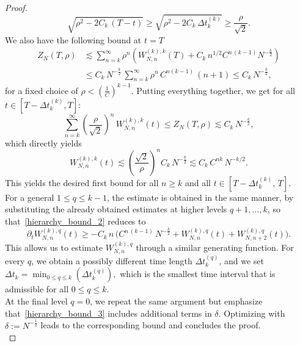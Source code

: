 \documentclass[pdflatex,sn-mathphys-num]{sn-jnl}
\theoremstyle{thmstyleone}%
\theoremstyle{thmstyletwo}%
\theoremstyle{thmstylethree}%
\begin{document}
\begin{proof}
\[
 \sqrt{\rho^2 - 2C_k\,(T-t)} \geq \sqrt{\rho^{2} - 2C_k\, \Delta t_k^{(k)} }\geq \frac{\rho}{\sqrt{2}} .
 \]
We also have the following bound at $t=T$
\begin{align*}
Z_{N}(T, \rho) 
&\lesssim \sum_{n=k}^\infty \rho^n \left(  W^{(k),k}_{N,n} (T) 
+ C_k\,n^{1/2} C^{n\,(k-1)} N^{-\frac{k}{2}}   \right) \\
&\leq C_k\,N^{-\frac{k}{2}}\,\sum_{n=k}^\infty \rho^n\,C^{n(k-1)}\,(n+1)  \leq C_k\,N^{-\frac{k}{2}} ,
\end{align*}
for a fixed choice of $\rho<\left(\frac{1}{C}\right)^{k-1}$. Putting everything together, we get for all \(t \in [T-\Delta t_k^{(k)},T]\):
\[
\sum_{n=k}^\infty \left( \frac{\rho}{\sqrt{2}} \right)^n\,W^{(k),k}_{N,n} (t)\leq Z_{N}(T, \rho) 
\lesssim C_k\,N^{-\frac{k}{2}},
\]
which directly yields
\[
  W^{(k),k}_{N,n} (t)  \lesssim \left(\frac{\sqrt{2}}{\rho}\right)^n C_k\,N^{-\frac{k}{2}}\lesssim C_k\,C^{nk}\,N^{-k/2}.
\]
%
This yields the desired first bound for all \(n \geq k\) and all \(t \in [T-\Delta t_k^{(k)},\,T]\).\\

\noindent
For a general \(1 \le q \le k-1\), the estimate is obtained in the same manner, by substituting the already obtained estimates at higher levels $q+1,...,k$, so that~\eqref{hierarchy_bound_2} reduces to 
\[ 
\partial_tW^{(k),q}_{N,n}(t) \geq -C_k\,n\,\Bigg( C^{n\,(k-1)}\,N^{-\frac{k}{2}}+ W_{N,n}^{(k),q}(t) + W_{N,n+2}^{(k),q} (t) \Bigg) .
\]
This allows us to estimate $W^{(k),q}_{N,n}$ through a similar generating function. For every $q$, we obtain a possibly different time length $\Delta t_k^{(q)}$, and we set
\(\Delta t_k = \min_{0 \leq q \leq k} \left(\Delta t_{k}^{(q)}\right),\) which is the smallest time interval that is admissible for all \(0 \le q \le k\).\\

\noindent
At the final level $q=0$, we repeat the same argument but emphasize that~\eqref{hierarchy_bound_3} includes additional terms in $\delta$. Optimizing with $\delta := N^{-\frac{1}{2}}$ leads to the corresponding bound and concludes the proof.\\


\end{proof}
\end{document}
